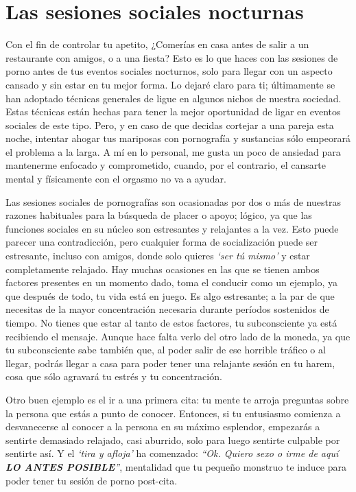 \documentclass[
  spanish,
  openany]{book}
\begin{document}
\hypertarget{las-sesiones-sociales-nocturnas}{%
\section{Las sesiones sociales nocturnas}\label{las-sesiones-sociales-nocturnas}}

Con el fin de controlar tu apetito, ¿Comerías en casa antes de salir a un restaurante con amigos, o a una fiesta? Esto es lo que haces con las sesiones de porno antes de tus eventos sociales nocturnos, solo para llegar con un aspecto cansado y sin estar en tu mejor forma. Lo dejaré claro para ti; últimamente se han adoptado técnicas generales de ligue en algunos nichos de nuestra sociedad. Estas técnicas están hechas para tener la mejor oportunidad de ligar en eventos sociales de este tipo. Pero, y en caso de que decidas cortejar a una pareja esta noche, intentar ahogar tus mariposas con pornografía y sustancias sólo empeorará el problema a la larga. A mí en lo personal, me gusta un poco de ansiedad para mantenerme enfocado y comprometido, cuando, por el contrario, el cansarte mental y físicamente con el orgasmo no va a ayudar.

Las sesiones sociales de pornografías son ocasionadas por dos o más de nuestras razones habituales para la búsqueda de placer o apoyo; lógico, ya que las funciones sociales en su núcleo son estresantes y relajantes a la vez. Esto puede parecer una contradicción, pero cualquier forma de socialización puede ser estresante, incluso con amigos, donde solo quieres \emph{`ser tú mismo'} y estar completamente relajado. Hay muchas ocasiones en las que se tienen ambos factores presentes en un momento dado, toma el conducir como un ejemplo, ya que después de todo, tu vida está en juego. Es algo estresante; a la par de que necesitas de la mayor concentración necesaria durante períodos sostenidos de tiempo. No tienes que estar al tanto de estos factores, tu subconsciente ya está recibiendo el mensaje. Aunque hace falta verlo del otro lado de la moneda, ya que tu subconsciente sabe también que, al poder salir de ese horrible tráfico o al llegar, podrás llegar a casa para poder tener una relajante sesión en tu harem, cosa que sólo agravará tu estrés y tu concentración.

Otro buen ejemplo es el ir a una primera cita: tu mente te arroja preguntas sobre la persona que estás a punto de conocer. Entonces, si tu entusiasmo comienza a desvanecerse al conocer a la persona en su máximo esplendor, empezarás a sentirte demasiado relajado, casi aburrido, solo para luego sentirte culpable por sentirte así. Y el \emph{`tira y afloja'} ha comenzado: \emph{``Ok. Quiero sexo o irme de aquí \textbf{LO ANTES POSIBLE}''}, mentalidad que tu pequeño monstruo te induce para poder tener tu sesión de porno post-cita.
\end{document}
